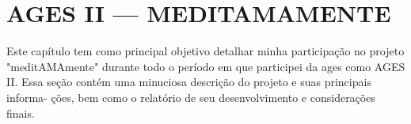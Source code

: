 \chapter[AGES II --- MEDITAMAMENTE]{AGES II --- MEDITAMAMENTE}

Este capítulo tem como principal objetivo detalhar minha participação no projeto "meditAMAmente" durante todo o período em que participei da \ac{ages} como AGES II.
Essa seção contém uma minuciosa descrição do projeto e suas principais informa-
ções, bem como o relatório de seu desenvolvimento e considerações finais.




